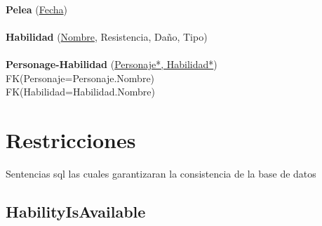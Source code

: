 \documentclass[a4paper,10pt]{article}
\newcommand\tab[1][1cm]{\hspace*{#1}}
\begin{document}
\paragraph{}
{\bf Pelea} (\underline{Fecha})

\paragraph{}
{\bf Habilidad} (\underline{Nombre}, Resistencia, Daño, Tipo)

\paragraph{}
{\bf Personage-Habilidad} (\underline{Personaje*, Habilidad*})\\
\tab FK(Personaje=Personaje.Nombre)\\
\tab FK(Habilidad=Habilidad.Nombre)

\pagebreak

\section{Restricciones}
Sentencias sql las cuales garantizaran la consistencia de la base de datos
\subsection{HabilityIsAvailable}
\begin{scriptsize}
  
\end{scriptsize}
\end{document}
